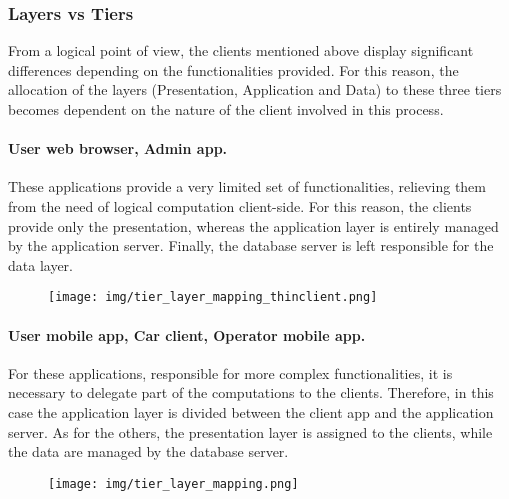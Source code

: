 \subsubsection{Layers vs Tiers}
	From a logical point of view, the clients mentioned above display significant differences depending on the functionalities provided. For this reason, the allocation of the layers (Presentation, Application and Data) to these three tiers becomes dependent on the nature of the client involved in this process.

	\paragraph{User web browser, Admin app.} These applications provide a very limited set of functionalities, relieving them from the need of logical computation client-side. For this reason, the clients provide only the presentation, whereas the application layer is entirely managed by the application server. Finally, the database server is left responsible for the data layer.
		\begin{figure}[h]
			\texttt{[image: img/tier\_layer\_mapping\_thinclient.png]}
		\end{figure}

	\paragraph{User mobile app, Car client, Operator mobile app.} For these applications, responsible for more complex functionalities, it is necessary to delegate part of the computations to the clients. Therefore, in this case the application layer is divided between the client app and the application server. As for the others, the presentation layer is assigned to the clients, while the data are managed by the database server.
			\begin{figure}[h]
				\texttt{[image: img/tier\_layer\_mapping.png]}
			\end{figure}
